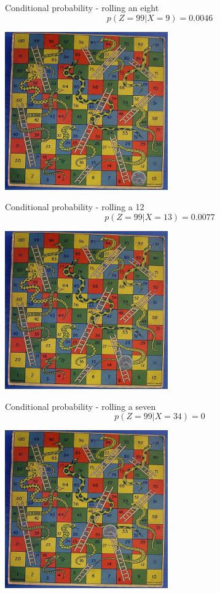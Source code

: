 \documentclass{beamer}
\newcommand{\crish}{\color{reddish}}
\newcommand{\cbla}{\color{black}}
\begin{document}
\begin{frame}{Conditional probability - rolling an eight}
    \crish $$ p(Z=99|X=9)=0.0046 $$ \cbla
  \begin{center}
    \includegraphics[width=7cm]{game9.jpg}
  \end{center}
\end{frame}


\begin{frame}{Conditional probability - rolling a 12}
    \crish $$ p(Z=99|X=13)=0.0077 $$ \cbla
  \begin{center}
    \includegraphics[width=7cm]{game13.jpg}
  \end{center}
\end{frame}

\begin{frame}{Conditional probability - rolling a seven}
    \crish $$ p(Z=99|X=34)=0 $$ \cbla
  \begin{center}
    \includegraphics[width=7cm]{game34.jpg}
  \end{center}
\end{frame}
\end{document}
